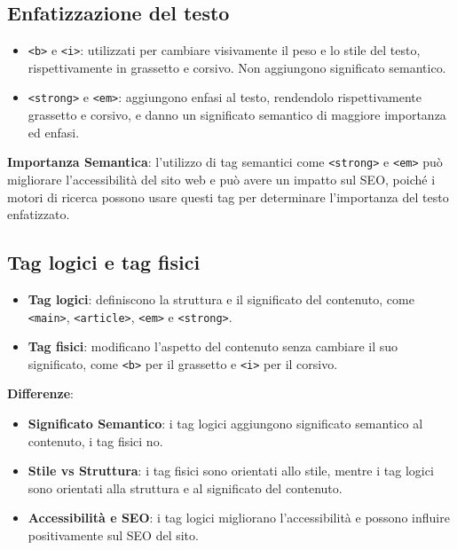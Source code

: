 \subsection{Enfatizzazione del testo}

\begin{itemize}
    \item \texttt{<b>} e \texttt{<i>}: utilizzati per cambiare visivamente il peso e lo stile del testo, rispettivamente in grassetto e corsivo. Non aggiungono significato semantico.
    \item \texttt{<strong>} e \texttt{<em>}: aggiungono enfasi al testo, rendendolo rispettivamente grassetto e corsivo, e danno un significato semantico di maggiore importanza ed enfasi.
\end{itemize}

\textbf{Importanza Semantica}: l'utilizzo di tag semantici come \texttt{<strong>} e \texttt{<em>} può migliorare l'accessibilità del sito web e può avere un impatto sul SEO, poiché i motori di ricerca possono usare questi tag per determinare l'importanza del testo enfatizzato.

\subsection{Tag logici e tag fisici}

\begin{itemize}
    \item \textbf{Tag logici}: definiscono la struttura e il significato del contenuto, come \texttt{<main>}, \texttt{<article>}, \texttt{<em>} e \texttt{<strong>}.
    \item \textbf{Tag fisici}: modificano l'aspetto del contenuto senza cambiare il suo significato, come \texttt{<b>} per il grassetto e \texttt{<i>} per il corsivo.
\end{itemize}

\textbf{Differenze}:
\begin{itemize}
    \item \textbf{Significato Semantico}: i tag logici aggiungono significato semantico al contenuto, i tag fisici no.
    \item \textbf{Stile vs Struttura}: i tag fisici sono orientati allo stile, mentre i tag logici sono orientati alla struttura e al significato del contenuto.
    \item \textbf{Accessibilità e SEO}: i tag logici migliorano l'accessibilità e possono influire positivamente sul SEO del sito.
\end{itemize}

